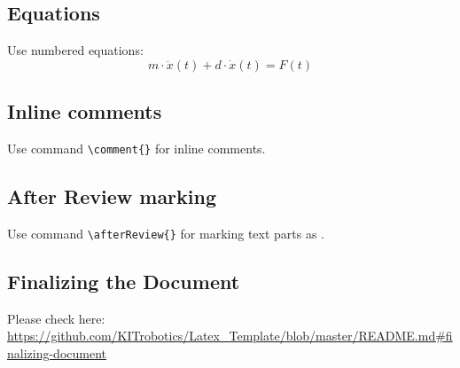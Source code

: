 \subsection{Equations}
Use numbered equations:
\begin{equation} \label{equ:equ}
  m \cdot \ddot{x}(t) + d \cdot \dot{x}(t) = F(t)
\end{equation}


\subsection{Inline comments}
Use command \texttt{\textbackslash comment\{\}} for inline comments.

\subsection{After Review marking}
Use command \texttt{\textbackslash afterReview\{\}} for marking text parts as .

\subsection{Finalizing the Document}
\label{ssec:finalizing_the_document}
Please check here: \url{https://github.com/KITrobotics/Latex_Template/blob/master/README.md#finalizing-document}
